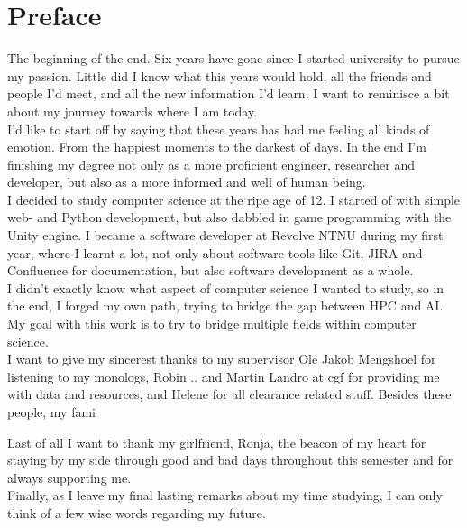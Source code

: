 \chapter*{Preface}

The beginning of the end. Six years have gone since I started university to pursue my passion. Little did I know what this years would hold, all the friends and people I'd meet, and all the new information I'd learn. I want to reminisce a bit about my journey towards where I am today. \\

I'd like to start off by saying that these years has had me feeling all kinds of emotion. From the happiest moments to the darkest of days. In the end I'm finishing my degree not only as a more proficient engineer, researcher and developer, but also as a more informed and well of human being. \\

I decided to study computer science at the ripe age of 12. I started of with simple web- and Python development, but also dabbled in game programming with the Unity engine. I became a software developer at Revolve NTNU during my first year, where I learnt a lot, not only about software tools like Git, JIRA and Confluence for documentation, but also software development as a whole. \\

I didn't exactly know what aspect of computer science I wanted to study, so in the end, I forged my own path, trying to bridge the gap between HPC and AI. My goal with this work is to try to bridge multiple fields within computer science. \\

I want to give my sincerest thanks to my supervisor Ole Jakob Mengshoel for listening to my monologs, Robin .. and Martin Landro at \acrlong{cgf} for providing me with data and resources, and Helene for all clearance related stuff. Besides these people, my fami

Last of all I want to thank my girlfriend, Ronja, the beacon of my heart for staying by my side through good and bad days throughout this semester and for always supporting me. \\

Finally, as I leave my final lasting remarks about my time studying, I can only think of a few wise words regarding my future.
